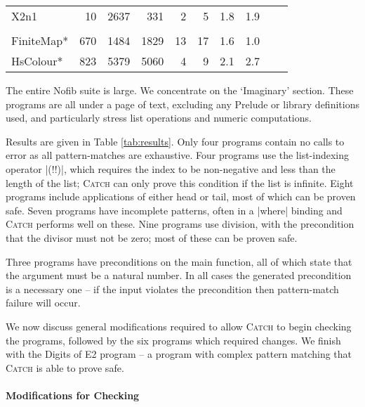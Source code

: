 \documentclass[preprint]{sigplanconf}
\newcommand{\C}[1]{\textsf{#1}}
\newcommand{\catch}{\textsc{Catch}}
\begin{document}
\begin{table}
\begin{tabular*}{\linewidth}{lrrrrrrlll}
\hspace{-2mm} X2n1                         & 10 & 2637 &  331 & 2 &  5 & 1.8 & 1.9 \\
\vspace{-1ex} \\
\hspace{-2mm} FiniteMap*    \hspace{-3mm} & 670 & 1484 & 1829 & 13 & 17 & 1.6 & 1.0 \\
\hspace{-2mm} HsColour*     \hspace{-3mm} & 823 & 5379 & 5060 & 4 &  9 & 2.1 & 2.7 \\
\hline
\end{tabular*}
\end{table}

The entire Nofib suite \citep{nofib} is large. We concentrate on the `Imaginary' section. These programs are all under a page of text, excluding any Prelude or library definitions used, and particularly stress list operations and numeric computations.

Results are given in Table \ref{tab:results}. Only four programs contain no calls to \C{error} as all pattern-matches are exhaustive. Four programs use the list-indexing operator |(!!)|, which requires the index to be non-negative and less than the length of the list; \catch{} can only prove this condition if the list is infinite. Eight programs include applications of either \C{head} or \C{tail}, most of which can be proven safe. Seven programs have incomplete patterns, often in a |where| binding and \catch{} performs well on these. Nine programs use division, with the precondition that the divisor must not be zero; most of these can be proven safe.

Three programs have preconditions on the \C{main} function, all of which state that the argument must be a natural number. In all cases the generated precondition is a necessary one -- if the input violates the precondition then pattern-match failure will occur.

We now discuss general modifications required to allow \catch{} to begin checking the programs, followed by the six programs which required changes. We finish with the Digits of E2 program -- a program with complex pattern matching that \catch{} is able to prove safe.

\paragraph{Modifications for Checking}
\end{document}
